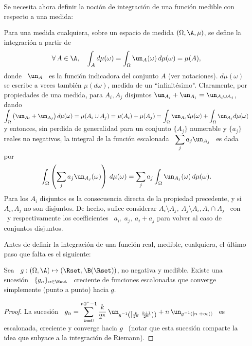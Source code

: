 Se necesita ahora definir la  noci\'on de integraci\'on de una funci\'on medible
con respecto a una medida:
%
\begin{definicion}
\label{Def:MP:MedidaIntegracion}
%
  Para una medida  cualquiera, sobre un espacio de  medida $(\Omega,\A,\mu)$, se
  define la integraci\'on a partir de
  \[
  \forall \, A \in \A,  \quad \int_A d\mu(\omega) = \int_\Omega \un_A(\omega) \,
  d\mu(\omega) = \mu(A),
  \]
  donde  \  $\un_A$  \  es   la  funci\'on  indicadora  del  conjunto  $A$  (ver
  notaciones).   $d\mu(\omega)$  se escribe  a  veces tambi\'en  $\mu(d\omega)$,
  medida de  un ``infinit\'esimo''.  Claramente, por propiedades  de una medida,
  para $ A_i, A_j$ disjuntos $\un_{A_i} + \un_{A_j} = \un_{A_i \cup A_j}$, dando
  $\displaystyle \int_\Omega \left( \un_{A_i} + \un_{A_j} \right) d\mu(\omega) =
  \mu(A_i \cup A_j) = \mu(A_i) + \mu(A_j) = \int_\Omega \un_{A_i} d\mu(\omega) +
  \int_\Omega  \un_{A_j} d\mu(\omega)$  y entonces,  sin perdida  de generalidad
  para un conjunto $\{ A_j \}$ numerable
  y $\{  a_j \}$ reales no negativos,  la integral de la  funci\'on escalonada \
  $\displaystyle \sum_j a_j \un_{A_j}$ \ es dada por
  \[
  \int_\Omega \left( \sum_j a_j \un_{A_j}(\omega) \right) \, d\mu(\omega) =
  \sum_j a_j \int_\Omega \un_{A_j}(\omega) \, d\mu(\omega).
  \]
  Para  los  $A_i$  disjuntos  es   la  consecuencia  directa  de  la  propiedad
  precedente, y  si $A_i,  A_j$ no son  disjuntos.  De hecho,  sufice considerar
  $A_i\setminus  A_j,  \:  A_j\setminus  A_i,  A_i \cap  A_j$  \  con  \modif{$A
    \setminus B = \{ \omega \tq \omega \in  A \: \et \: \omega \notin B \}$} \
  y respectivamente los coefficientes \ $a_i,  \: a_j, \: a_i + a_j$ para volver
  al caso de conjuntos disjuntos.
\end{definicion}


Antes de definir la integraci\'on de una funci\'on real, medible, cualquiera, el
\'ultimo paso que falta es el siguiente:
%
\begin{teorema}
\label{Teo:MP:MedibleLimite}
%
  Sea   \   $g:   (\Omega,\A)   \mapsto  (\Rset,\B(\Rset))$,   no   negativa   y
  medible. Existe  una sucesi\'on  \ $\{  g_n \}_{n \in  \Nset}$ \  creciente de
  funciones escalonadas que converge simplemente (punto a punto) hacia $g$.
\end{teorema}
%
\begin{proof}
  La  sucesi\'on \ $\displaystyle  g_n =  \sum_{k=0}^{n 2^n-1}  \frac{k}{2^n} \,
  \un_{g^{-1}\left( \left[ \frac{k}{2^n} \; \frac{k+1}{2^n} \right) \right)} + n
  \, \un_{g^{-1}\left(  \left[ n \;  +\infty \right) \right)}$ \  es escalonada,
  creciente y converge  hacia $g$ \ (notar que esta  sucesi\'on comparte la idea
  que subyace a la integraci\'on de Riemann).
\end{proof}

